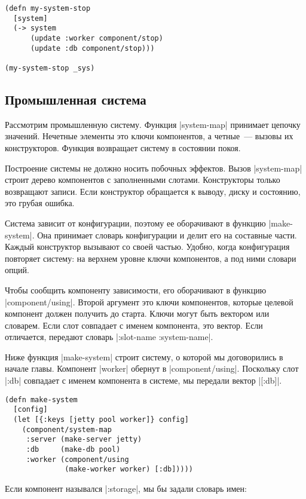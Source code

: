\begin{verbatim}
(defn my-system-stop
  [system]
  (-> system
      (update :worker component/stop)
      (update :db component/stop)))

(my-system-stop _sys)
\end{verbatim}

\subsection{Промышленная система}

Рассмотрим промышленную систему. Функция \spverb|system-map| принимает цепочку
значений. Нечетные элементы это ключи компонентов, а четные~--- вызовы их
конструкторов. Функция возвращает систему в состоянии покоя.

Построение системы не должно носить побочных эффектов. Вызов \spverb|system-map|
строит дерево компонентов с заполненными слотами. Конструкторы только возвращают
записи. Если конструктор обращается к выводу, диску и состоянию, это грубая
ошибка.

Система зависит от конфигурации, поэтому ее оборачивают в функцию
\spverb|make-system|. Она принимает словарь конфигурации и делит его на
составные части. Каждый конструктор вызывают со своей частью. Удобно, когда
конфигурация повторяет систему: на верхнем уровне ключи компонентов, а под ними
словари опций.

Чтобы сообщить компоненту зависимости, его оборачивают в функцию
\spverb|component/using|. Второй аргумент это ключи компонентов, которые целевой
компонент должен получить до старта. Ключи могут быть вектором или
словарем. Если слот совпадает с именем компонента, это вектор. Если отличается,
передают словарь \spverb|{:slot-name :system-name}|.

Ниже функция \spverb|make-system| строит систему, о которой мы договорились в
начале главы. Компонент \spverb|worker| обернут в
\spverb|component/using|. Поскольку слот \spverb|:db| совпадает с именем
компонента в системе, мы передали вектор \spverb|[:db]|.

\begin{verbatim}
(defn make-system
  [config]
  (let [{:keys [jetty pool worker]} config]
    (component/system-map
     :server (make-server jetty)
     :db     (make-db pool)
     :worker (component/using
              (make-worker worker) [:db]))))
\end{verbatim}

Если компонент назывался \spverb|:storage|, мы бы задали словарь имен:

